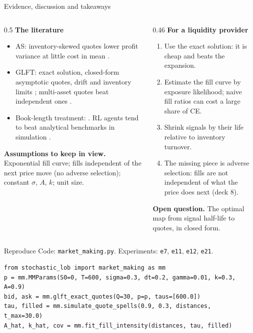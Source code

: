 \documentclass[aspectratio=169,10pt]{beamer}
\begin{document}
\begin{frame}{Evidence, discussion and takeaways}
  \small
  \begin{columns}[T]
    \begin{column}{0.5\textwidth}
      \textbf{The literature}
      \begin{itemize}
        \item AS: inventory-skewed quotes lower profit variance at little cost in mean \citep{avellaneda2008high}.
        \item GLFT: exact solution, closed-form asymptotic quotes, drift and inventory limits \citep{gueant2013dealing}; multi-asset quotes beat independent ones \citep{gueant2017optimal}.
        \item Book-length treatment: \citet{cartea2015algorithmic}. RL agents tend to beat analytical benchmarks in simulation \citep{gasperov2021reinforcement}.
      \end{itemize}
      \textbf{Assumptions to keep in view.} Exponential fill curve; fills independent of the next price move (no adverse selection); constant $\sigma$, $A$, $k$; unit size.
    \end{column}
    \begin{column}{0.46\textwidth}
      \textbf{For a liquidity provider}
      \begin{enumerate}
        \item Use the exact solution: it is cheap and beats the expansion.
        \item Estimate the fill curve by exposure likelihood; naive fill ratios can cost a large share of CE.
        \item Shrink signals by their life relative to inventory turnover.
        \item The missing piece is adverse selection: fills are not independent of what the price does next (deck 8).
      \end{enumerate}
      \textbf{Open question.} The optimal map from signal half-life to quotes, in closed form.
    \end{column}
  \end{columns}
\end{frame}

\begin{frame}[fragile]{Reproduce}
  \small
  Code: \texttt{market\_making.py}. Experiments: \texttt{e7}, \texttt{e11}, \texttt{e12}, \texttt{e21}.
\begin{verbatim}
from stochastic_lob import market_making as mm
p = mm.MMParams(S0=0, T=600, sigma=0.3, dt=0.2, gamma=0.01, k=0.3, A=0.9)
bid, ask = mm.glft_exact_quotes(Q=30, p=p, taus=[600.0])
tau, filled = mm.simulate_quote_spells(0.9, 0.3, distances, t_max=30.0)
A_hat, k_hat, cov = mm.fit_fill_intensity(distances, tau, filled)
\end{verbatim}
\end{frame}

\deckreferences
\end{document}
